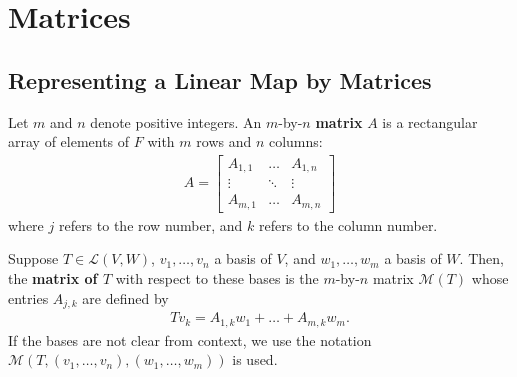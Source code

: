 \documentclass{memoir}
\begin{document}
\section{Matrices}
\label{cha:matrices}
\subsection{Representing a Linear Map by Matrices}
\begin{defn}[Matrix]
	Let $m$ and $n$ denote positive integers. An $m$-by-$n$ \textbf{matrix} $A$ is a rectangular array of elements of $F$ with $m$ rows and $n$ columns:
\begin{align*}
	A = \begin{bmatrix} A_{1,1} & \dots & A_{1,n} \\
		\vdots & \ddots & \vdots \\
		A_{m,1} & \dots & A_{m,n}
	\end{bmatrix} 
\end{align*}
where $j$ refers to the row number, and $k$ refers to the column number.
\end{defn}
\begin{defn}

Suppose $T \in \mathcal{L}(V,W)$, $v_1,\ldots,v_n$ a basis of $V$, and $w_1,\ldots,w_m$ a basis of $W$. Then, the \textbf{matrix of $T$} with respect to these bases is the $m$-by-$n$ matrix $\mathcal{M}(T)$ whose entries $A_{j,k}$ are defined by
\begin{align*}
	Tv_k = A_{1,k}w_1 + \ldots + A_{m,k}w_m .
\end{align*}
If the bases are not clear from context, we use the notation $\mathcal{M}(T,(v_1,\ldots,v_n),(w_1,\ldots,w_m))$ is used.

\end{defn}
\color{gray}
\end{document}
